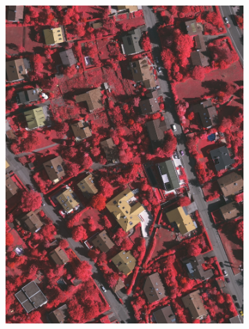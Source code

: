 \begin{figure}[htb]
 \begin{subfigure}{0.24\textwidth}
   \centering
   \includegraphics[width=1\linewidth]{fig/vai/23.JPG} 
   \caption{}
 \end{subfigure}\vspace{1mm}
 \begin{subfigure}{0.24\textwidth}
   \centering

\end{subfigure}
\end{figure}
